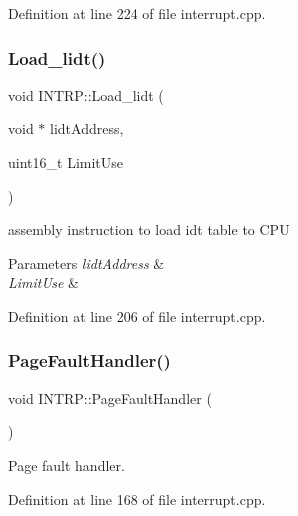 Definition at line 224 of file interrupt.\+cpp.

\mbox{\label{namespace_i_n_t_r_p_a194f85d6c873615e9125466e3b23c30f}} 
\subsubsection{\texorpdfstring{Load\+\_\+lidt()}{Load\_lidt()}}
{\footnotesize\ttfamily void I\+N\+T\+R\+P\+::\+Load\+\_\+lidt (\begin{DoxyParamCaption}\item[{void $\ast$}]{lidt\+Address,  }\item[{uint16\+\_\+t}]{Limit\+Use }\end{DoxyParamCaption})\hspace{0.3cm}{\ttfamily [inline]}}



assembly instruction to load idt table to C\+PU 


\begin{DoxyParams}{Parameters}
{\em lidt\+Address} & \\
\hline
{\em Limit\+Use} & \\
\hline
\end{DoxyParams}


Definition at line 206 of file interrupt.\+cpp.

\mbox{\label{namespace_i_n_t_r_p_aff35666b88439353d86e253d3051f27f}} 
\subsubsection{\texorpdfstring{Page\+Fault\+Handler()}{PageFaultHandler()}}
{\footnotesize\ttfamily void I\+N\+T\+R\+P\+::\+Page\+Fault\+Handler (\begin{DoxyParamCaption}{ }\end{DoxyParamCaption})}



Page fault handler. 



Definition at line 168 of file interrupt.\+cpp.

\mbox{\label{namespace_i_n_t_r_p_a91a6a2668bfa9961a9ed265f6ceac47d}} 
